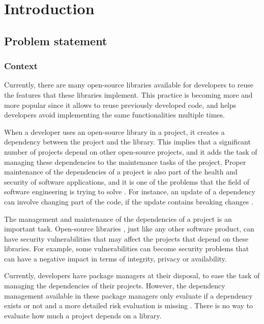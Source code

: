 \chapter{Introduction}\label{ch:Introduction}

\section{Problem statement}

\subsection{Context}
Currently, there are many open-source libraries available for developers to reuse the features that these libraries implement. This practice is becoming more and more popular since it allows to reuse previously developed code, and helps developers avoid implementing the same functionalities multiple times.

When a developer uses an open-source library in a project, it creates a dependency between the project and the library. This implies that a significant number of projects depend on other open-source projects, and it adds the task of managing these dependencies to the maintenance tasks of the project.  Proper maintenance of the dependencies of a project is also part of the health and security of software applications, and it is one of the problems that the field of software engineering is trying to solve \cite{kula2014visualizing}. For instance, an update of a dependency can involve changing part of the code, if the update contains breaking changes \cite{Raemaekers2017}. %

The management and maintenance of the dependencies of a project is an important task. Open-source libraries , just like any other software product, can have security vulnerabilities that may affect the projects that depend on these libraries. For example, some vulnerabilities can become security problems that can have a negative impact in terms of integrity, privacy or availability.


\blankl %
Currently, developers have package managers at their disposal, to ease the task of managing the dependencies of their projects. However, the dependency management available in these package managers only evaluate if a dependency exists or not and a more detailed risk evaluation is missing \cite{hejderup2018prazi}. There is no way to evaluate how much a project depends on a library.

